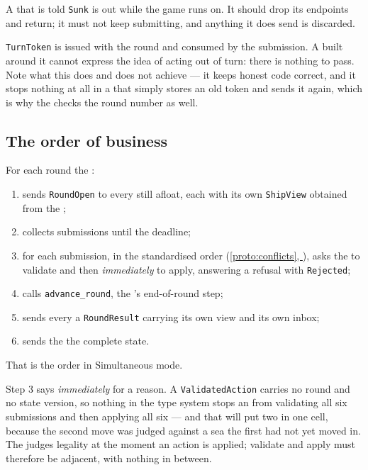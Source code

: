 \documentclass{article}
\newcommand{\fullref}[1]{\hyperref[#1]{\cref*{#1}, \nameref*{#1}}}
\begin{document}
A \ship{} that is told \texttt{Sunk} is out while the game runs on. It should drop its endpoints
and return; it must not keep submitting, and anything it does send is discarded.

\texttt{TurnToken} is issued with the round and consumed by the submission. A \ship{} built around
it cannot express the idea of acting out of turn: there is nothing to pass. Note what this does and
does not achieve --- it keeps honest code correct, and it stops nothing at all in a \ship{} that
simply stores an old token and sends it again, which is why the \admiralty{} checks the round
number as well.

\subsection{The order of business}

For each round the \admiralty:

\begin{enumerate}
    \item sends \texttt{RoundOpen} to every \ship{} still afloat, each with its
      own \texttt{ShipView} obtained from the \chart;
    \item collects submissions until the deadline;
    \item for each submission, in the standardised order (\fullref{proto:conflicts}), asks the
      \chart{} to validate and then \emph{immediately} to apply, answering a refusal with
      \texttt{Rejected};
    \item calls \texttt{advance\_round}, the \chart's end-of-round step;
    \item sends every \ship{} a \texttt{RoundResult} carrying its own view and its own inbox;
    \item sends the \cartographer{} the complete state.
\end{enumerate}

That is the order in Simultaneous mode.

Step 3 says \emph{immediately} for a reason. A \texttt{ValidatedAction} carries no round and no
state version, so nothing in the type system stops an \admiralty{} from validating all six
submissions and then applying all six --- and that \admiralty{} will put two \ships{} in one cell,
because the second move was judged against a sea the first had not yet moved in. The \MD{} judges
legality at the moment an action is applied; validate and apply must therefore be adjacent, with
nothing in between.
\end{document}
